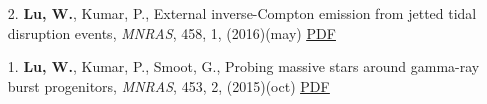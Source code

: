 \begin{itemize}[leftmargin=0.65cm]
\vspace{-0.1cm}
\item[2.]{{\bf Lu, W.}, Kumar, P., {External inverse-Compton emission from jetted tidal disruption events}, {\it MNRAS}, 458, 1, (2016)(may) \href{https://ui.adsabs.harvard.edu/abs/2016MNRAS.458.1071L}{\underline{PDF}}}

\vspace{-0.1cm}
\item[1.]{{\bf Lu, W.}, Kumar, P., Smoot, G., {Probing massive stars around gamma-ray burst progenitors}, {\it MNRAS}, 453, 2, (2015)(oct) \href{https://ui.adsabs.harvard.edu/abs/2015MNRAS.453.1458L}{\underline{PDF}}}
\end{itemize}